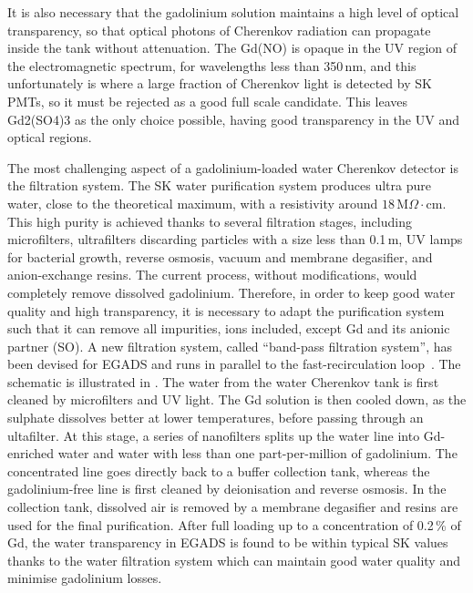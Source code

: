 It is also necessary that the gadolinium solution maintains a high level of optical transparency, %
so that optical photons of Cherenkov radiation can propagate inside the tank without attenuation.
The Gd(NO) is opaque in the UV region of the electromagnetic spectrum, for wavelengths less than 350\,nm, %
and this unfortunately is where a large fraction of Cherenkov light is detected by SK PMTs, %
so it must be rejected as a good full scale candidate.
This leaves Gd2(SO4)3 as the only choice possible, having good transparency in the UV and optical regions.

The most challenging aspect of a gadolinium-loaded water Cherenkov detector is the filtration system.
The SK water purification system produces ultra pure water, close to the theoretical maximum, %
with a resistivity around $18$\,M$\Omega\cdot$cm.
This high purity is achieved thanks to several filtration stages, including microfilters, %
ultrafilters discarding particles with a size less than 0.1\,\textmu m, UV lamps for bacterial growth, %
reverse osmosis, vacuum and membrane degasifier, and anion-exchange resins.
The current process, without modifications, would completely remove dissolved gadolinium.
Therefore, in order to keep good water quality and high transparency, it is necessary to adapt the purification system %
such that it can remove all impurities, ions included, except Gd and its anionic partner (SO).
A new filtration system, called ``band-pass filtration system'', has been devised for EGADS and runs in parallel to %
the fast-recirculation loop~\cite{Ikeda:2019pcm}.
The schematic is illustrated in .
The water from the water Cherenkov tank is first cleaned by microfilters and UV light.
The Gd solution is then cooled down, as the sulphate dissolves better at lower temperatures, %
before passing through an ultafilter.
At this stage, a series of nanofilters splits up the water line into Gd-enriched water and %
water with less than one part-per-million of gadolinium.
The concentrated line goes directly back to a buffer collection tank, whereas the gadolinium-free line %
is first cleaned by deionisation and reverse osmosis.
In the collection tank, dissolved air is removed by a membrane degasifier and resins are used %
for the final purification.
After full loading up to a concentration of 0.2\,\% of Gd, the water transparency in EGADS is found to be within typical SK values %
thanks to the water filtration system which can maintain good water quality and minimise gadolinium losses.

